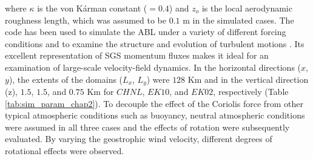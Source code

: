 \noindent where $\kappa$ is the von K\'arman constant ($=0.4$) and $z_o$ is the local aerodynamic roughness length, which was assumed to be $0.1$ m in the simulated cases. The code has been used to simulate the ABL under a variety of different forcing conditions \citep[e.g.,][]{stoll_jas_2009,bailey_blm_2013,miller_blm_2013} and to examine the structure and evolution of turbulent motions \citep[e.g.,][]{bailey_ae_2014,bailey_jfm_2016}.  Its excellent representation of SGS momentum fluxes \citep{stoll_wrr_2006} makes it ideal for an examination of large-scale velocity-field dynamics. In the horizontal directions ($x$, $y$), the extents of the domains ($L_x$, $L_y$) were $128$ Km and in the vertical direction (z), $1.5$, $1.5$, and $0.75$ Km for $CHNL$, $EK10$, and $EK02$, respectively (Table \ref{tab:sim_param_chap2}).  To decouple the effect of the Coriolis force from other typical atmospheric conditions such as buoyancy, neutral atmospheric conditions were assumed in all three cases and the effects of rotation were subsequently evaluated. By varying the geostrophic wind velocity, different degrees of rotational effects were observed. 

